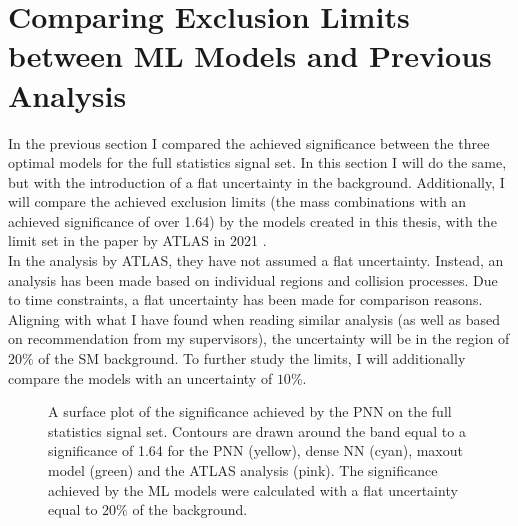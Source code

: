 \section{Comparing Exclusion Limits between ML Models and Previous Analysis}
In the previous section I compared the achieved significance between 
the three optimal models for the full statistics signal set. In this section 
I will do the same, but with the introduction of a flat uncertainty in the background.
Additionally, I will compare the achieved exclusion limits (the mass combinations with an achieved 
significance of over 1.64) by the models created in this thesis, with the limit set in the paper by ATLAS 
in 2021 \cite{atlas_search_2021}.
\\
In the analysis by ATLAS, they have not assumed a flat uncertainty. Instead, an analysis has been made based on 
individual regions and collision processes. Due to time constraints, a flat uncertainty has been made for comparison 
reasons. Aligning with what I have found when reading similar analysis (as well as based on recommendation from my supervisors), 
the uncertainty will be in the region of $20\%$ of the \ac{SM} background. To further study the limits, I will additionally 
compare the models with an uncertainty of $10\%$.\\
\begin{figure}
    \caption{A surface plot of the significance achieved by the \ac{PNN} on the full statistics signal set. Contours are 
    drawn around the band equal to a significance of 1.64 for the \ac{PNN} (yellow), dense \ac{NN} (cyan), maxout model (green)
    and the ATLAS analysis (pink). The significance achieved by the \ac{ML} models were calculated with a flat uncertainty equal 
    to $20\%$ of the background.}
    \label{fig:compLimit20}
\end{figure}

